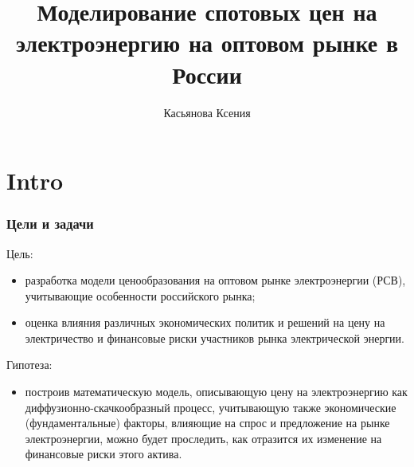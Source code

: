 \documentclass[c, dvipsnames]{beamer}  %
\title[   Моделирование цен на электричество ]{Моделирование спотовых цен на электроэнергию    на оптовом рынке  в России }
\author[Касьянова Ксения]{Касьянова Ксения \\ \smallskip \scriptsize  }
\institute[РАНХиГС]{ \uppercase{
  Институт отраслевых рынков и инфраструктуры}}
\date{}
\begin{document}
\frame[plain]{\titlepage}	%

\section{Intro}

\begin{frame}[shrink=3]
\frametitle{Цели и задачи} 



\begin{block}{Цель:}
	\begin{itemize}
		
		\item разработка модели ценообразования на оптовом рынке электроэнергии (РСВ), учитывающие особенности российского рынка; 
		
		\item оценка влияния различных экономических политик и решений на цену на электричество и финансовые риски участников рынка электрической энергии. 
		
	\end{itemize}

	
\end{block}

\begin{block}{Гипотеза:}
	\begin{itemize}
		
		\item построив математическую  модель, описывающую  цену на электроэнергию как диффузионно-скачкообразный процесс,  учитывающую также экономические (фундаментальные) факторы, влияющие на спрос и предложение на рынке электроэнергии, можно будет проследить, как отразится их изменение   на финансовые риски этого актива.
		
	
		
		
	\end{itemize}
\end{block}






\end{frame}
\end{document}
